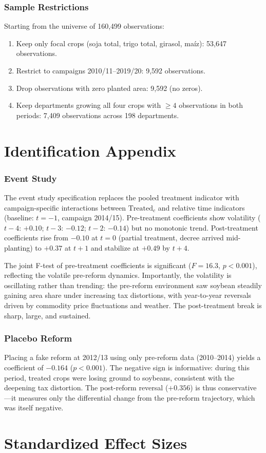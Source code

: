 \documentclass[12pt]{article}
\begin{document}
\subsubsection*{Sample Restrictions}
Starting from the universe of 160,499 observations:
\begin{enumerate}
\item Keep only focal crops (soja total, trigo total, girasol, maíz): 53,647 observations.
\item Restrict to campaigns 2010/11--2019/20: 9,592 observations.
\item Drop observations with zero planted area: 9,592 (no zeros).
\item Keep departments growing all four crops with $\geq 4$ observations in both periods: 7,409 observations across 198 departments.
\end{enumerate}

\section{Identification Appendix}
\label{sec:app_id}

\subsubsection*{Event Study} The event study specification replaces the pooled treatment indicator with campaign-specific interactions between $\text{Treated}_c$ and relative time indicators (baseline: $t = -1$, campaign 2014/15). Pre-treatment coefficients show volatility ($t-4$: $+0.10$; $t-3$: $-0.12$; $t-2$: $-0.14$) but no monotonic trend. Post-treatment coefficients rise from $-0.10$ at $t=0$ (partial treatment, decree arrived mid-planting) to $+0.37$ at $t+1$ and stabilize at $+0.49$ by $t+4$.

The joint F-test of pre-treatment coefficients is significant ($F = 16.3$, $p < 0.001$), reflecting the volatile pre-reform dynamics. Importantly, the volatility is oscillating rather than trending: the pre-reform environment saw soybean steadily gaining area share under increasing tax distortions, with year-to-year reversals driven by commodity price fluctuations and weather. The post-treatment break is sharp, large, and sustained.

\subsubsection*{Placebo Reform} Placing a fake reform at 2012/13 using only pre-reform data (2010--2014) yields a coefficient of $-0.164$ ($p < 0.001$). The negative sign is informative: during this period, treated crops were losing ground to soybeans, consistent with the deepening tax distortion. The post-reform reversal ($+0.356$) is thus conservative---it measures only the differential change from the pre-reform trajectory, which was itself negative.


\section{Standardized Effect Sizes}
\label{sec:sde}


\end{document}
